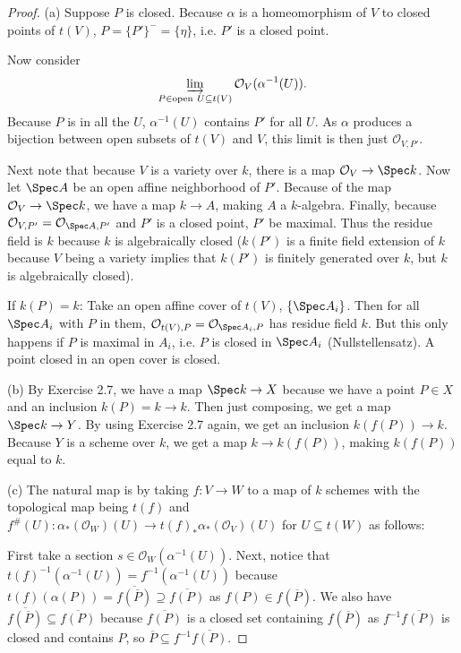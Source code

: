 \begin{proof}
	(a) Suppose $P $ is closed.
	Because $\alpha $ is a homeomorphism of $V $ to closed points of $t(V) $, $P = \{P' \} ^- = \{\eta \}     $, i.e. $P'  $ is a closed point.

	Now consider
	\[
		\varinjlim_{P \in \text{open}\ U \subseteq t(V)} \mathcal{O}_V(\alpha ^{-1}(U))
	.\]
	Because $P $ is in all the $U $, $\alpha ^{-1}(U) $ contains $P'$ for all $U $.
	As $\alpha $ produces a bijection between open subsets of $t(V) $ and $V $, this limit is then just $\mathcal{O}_{V,P' } $.

	Next note that because $V $ is a variety over $k $, there is a map $\mathcal{O}_V \to \Spec k $.
	Now let $\Spec A $ be an open affine neighborhood of $P' $.
	Because of the map $\mathcal{O}_V \to \Spec k $, we have a map $k \to A $, making $A $ a $k $-algebra.
	Finally, because $\mathcal{O}_{V,P'} = \mathcal{O}_{\Spec A,P'} $ and $P' $ is a closed point, $P' $ be maximal.
	Thus the residue field is $k $ because $k $ is algebraically closed ($k(P') $ is a finite field extension of $k $ because $V $ being a variety implies that $k(P') $ is finitely generated over $k $, but $k $ is algebraically closed).

	If $k(P) = k$:
	Take an open affine cover of $t(V) $, $\{\Spec A_i\}   $.
	Then for all $\Spec A_i $ with $P $ in them, $\mathcal{O}_{t(V),P} = \mathcal{O}_{\Spec A_i, P}$ has residue field $k $.
	But this only happens if $P $ is maximal in $A_i $, i.e. $P $ is closed in $\Spec A_i $ (Nullstellensatz).
	A point closed in an open cover is closed.

	(b) By Exercise 2.7, we have a map $\Spec k \to X $ because we have a point $P \in X $ and an inclusion $k(P) = k \to k $.
	Then just composing, we get a map $\Spec k \to Y $.
	By using Exercise 2.7 again, we get an inclusion $k(f(P)) \to k $.
	Because $Y $ is a scheme over $k $, we get a map $k\to k(f(P)) $, making $k(f(P)) $ equal to $k $.

	(c)
	The natural map is by taking $f: V\to W $ to a map of $k $ schemes with the topological map being $t(f) $ and $f^\#(U): \alpha_{\ast}(\mathcal{O}_W)(U) \to t(f)_\ast \alpha_\ast(\mathcal{O}_V)(U)$ for $U\subseteq t(W) $ as follows:

	First take a section $s \in \mathcal{O}_W(\alpha ^{-1}(U)) $.
	Next, notice that $t(f)^{-1}(\alpha ^{-1}(U)) = f^{-1}(\alpha ^{-1}(U)) $ because $t(f)(\alpha(P)) = \overline{f(\overline{P}) } \supseteq \overline{f(P)}$ as $f(P) \in f(\overline{P})  $.
	We also have $\overline{f(\overline{P}) } \subseteq \overline{f(P)}   $ because $\overline{f(P)}  $ is a closed set containing $f(\overline{P})  $ as $f^{-1}\overline{f(P)}$ is closed and contains $P $, so $\overline{P} \subseteq f^{-1}\overline{f(P)}   $.


\end{proof}
